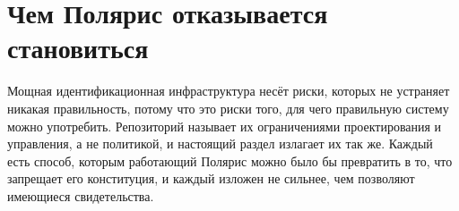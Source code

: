 \section{Чем Полярис отказывается становиться}
\label{sec:boundaries}



Мощная идентификационная инфраструктура несёт риски, которых не устраняет никакая правильность,
потому что это риски того, для чего правильную систему можно употребить. Репозиторий называет их
ограничениями проектирования и управления, а не политикой, и настоящий раздел излагает их так же.
Каждый есть способ, которым работающий Полярис можно было бы превратить в то, что запрещает его
конституция, и каждый изложен не сильнее, чем позволяют имеющиеся свидетельства.


